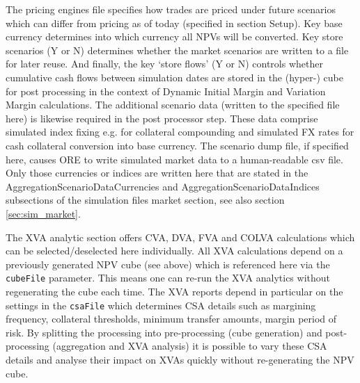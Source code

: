\documentclass[12pt, a4paper]{article}
\begin{document}
The pricing engines file specifies how trades are priced under future scenarios which can differ from pricing as of
today (specified in section Setup).  Key base currency determines into which currency all NPVs will be converted. Key
store scenarios (Y or N) determines whether the market scenarios are written to a file for later reuse. And finally, the
key `store flows' (Y or N) controls whether cumulative cash flows between simulation dates are stored in the (hyper-)
cube for post processing in the context of Dynamic Initial Margin and Variation Margin calculations. The additional
scenario data (written to the specified file here) is likewise required in the post processor step. These data comprise
simulated index fixing e.g. for collateral compounding and simulated FX rates for cash collateral conversion into base
currency. The scenario dump file, if specified here, causes ORE to write simulated market data to a human-readable csv
file. Only those currencies or indices are written here that are stated in the AggregationScenarioDataCurrencies and 
AggregationScenarioDataIndices subsections of the simulation files market section, see also section
\ref{sec:sim_market}.
 
\medskip The XVA analytic section offers CVA, DVA, FVA and COLVA calculations which can be selected/deselected here
individually. All XVA calculations depend on a previously generated NPV cube (see above) which is referenced here via
the {\tt cubeFile} parameter. This means one can re-run the XVA analytics without regenerating the cube each time. The
XVA reports depend in particular on the settings in the {\tt csaFile} which determines CSA details such as margining
frequency, collateral thresholds, minimum transfer amounts, margin period of risk. By splitting the processing into
pre-processing (cube generation) and post-processing (aggregation and XVA analysis) it is possible to vary these CSA
details and analyse their impact on XVAs quickly without re-generating the NPV cube.
\end{document}

